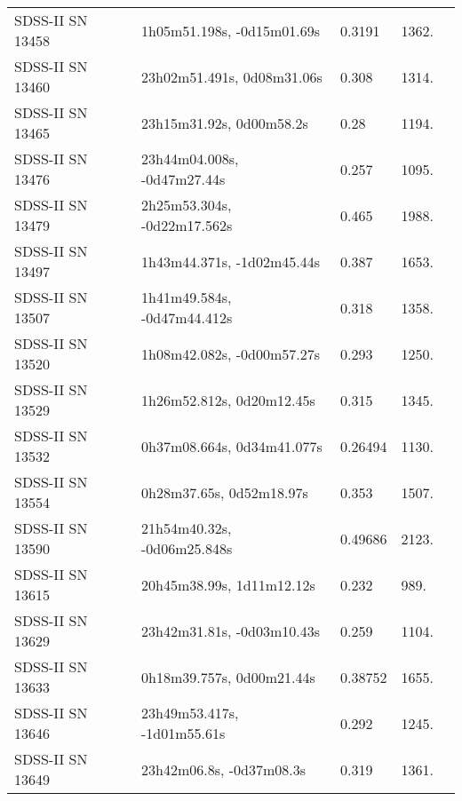 \begin{longtable}{lllll}
 SDSS-II SN 13458 &     1h05m51.198s, -0d15m01.69s &   0.3191 &          1362. &    \citet{2011ApJ...738..162S} \\
 SDSS-II SN 13460 &     23h02m51.491s, 0d08m31.06s &    0.308 &          1314. &    \citet{2011ApJ...738..162S} \\
 SDSS-II SN 13465 &       23h15m31.92s, 0d00m58.2s &     0.28 &          1194. &    \citet{2005ApJS..158..161H} \\
 SDSS-II SN 13476 &    23h44m04.008s, -0d47m27.44s &    0.257 &          1095. &    \citet{2011ApJ...738..162S} \\
 SDSS-II SN 13479 &    2h25m53.304s, -0d22m17.562s &    0.465 &          1988. &    \citet{2011ApJ...738..162S} \\
 SDSS-II SN 13497 &     1h43m44.371s, -1d02m45.44s &    0.387 &          1653. &    \citet{2011ApJ...738..162S} \\
 SDSS-II SN 13507 &    1h41m49.584s, -0d47m44.412s &    0.318 &          1358. &    \citet{2011ApJ...738..162S} \\
 SDSS-II SN 13520 &     1h08m42.082s, -0d00m57.27s &    0.293 &          1250. &    \citet{2011ApJ...738..162S} \\
 SDSS-II SN 13529 &      1h26m52.812s, 0d20m12.45s &    0.315 &          1345. &    \citet{2011ApJ...738..162S} \\
 SDSS-II SN 13532 &     0h37m08.664s, 0d34m41.077s &  0.26494 &          1130. &    \citet{2016SDSSD.C...0000:} \\
 SDSS-II SN 13554 &       0h28m37.65s, 0d52m18.97s &    0.353 &          1507. &    \citet{2011ApJ...738..162S} \\
 SDSS-II SN 13590 &    21h54m40.32s, -0d06m25.848s &  0.49686 &          2123. &    \citet{2016SDSSD.C...0000:} \\
 SDSS-II SN 13615 &      20h45m38.99s, 1d11m12.12s &    0.232 &           989. &    \citet{2010ApJ...713.1026D} \\
 SDSS-II SN 13629 &     23h42m31.81s, -0d03m10.43s &    0.259 &          1104. &    \citet{2011ApJ...738..162S} \\
 SDSS-II SN 13633 &      0h18m39.757s, 0d00m21.44s &  0.38752 &          1655. &    \citet{2016SDSSD.C...0000:} \\
 SDSS-II SN 13646 &    23h49m53.417s, -1d01m55.61s &    0.292 &          1245. &    \citet{2010ApJ...713.1026D} \\
 SDSS-II SN 13649 &       23h42m06.8s, -0d37m08.3s &    0.319 &          1361. &    \citet{2010ApJ...713.1026D} \\

\end{longtable}
